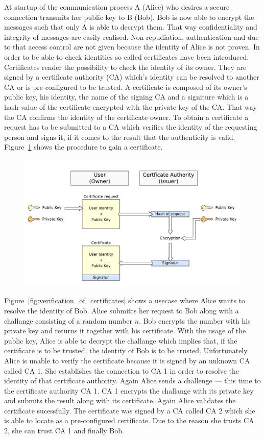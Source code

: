 At startup of the communication process A (Alice) who desires a secure connection transmits her public key to B (Bob).
Bob is now able to encrypt the messages such that only A is able to decrypt them.
That way confidentiality and integrity of messages are easily realised.
Non-repudiation, authentication and due to that access control are not given because the identity of Alice is not proven.
In order to be able to check identities so called certificates have been introduced.
Certificates render the possibility to check the identity of its owner. They are signed by a certificate authority (CA) which's identity can be resolved to another CA or is  pre-configured to be trusted.
A certificate is composed of its owner's public key, his identity, the name of the signing CA and a signiture which is a hash-value of the certificate encrypted with the private key of the CA. 
That way the CA confirms the identity of the certificate owner. 
To obtain a certificate a request has to be submitted to a CA which verifies the identity of the requesting person and signs it, if it comes to the result that the authenticity is valid. Figure~\ref{fig:certificate_request} shows the procedure to gain a certificate.
\begin{figure}[htb]
	\centering%
 	\includegraphics[width=13cm]{tex_tls_echoservice/certificates.pdf}
	\label{fig:certificate_request}
\end{figure}
Figure~\ref{fig:verification_of_certificates} shows a usecase where Alice wants to resolve the identity of Bob. Alice submitts her request to Bob along with a challange consisting of a random number $n$. Bob encrypts the number with his private key and returns it together with his certificate. With the usage of the public key, Alice is able to decrypt the challange which implies that, if the certificate is to be trusted, the identity of Bob is to be trusted. Unfortunately Alice is unable to verify the certificate because it is signed by an unknown CA called CA 1. She establishes the connection to CA 1 in order to resolve the identity of that certificate authority. Again Alice sends a challenge --- this time to the certificate authority CA 1. CA 1 encrypts the challange with its private key and submits the result along with its certificate. Again Alice validates the certificate sucessfully. 
The certificate was signed by a CA called CA 2 which she is able to locate as a pre-configured certificate. Due to the reason she trusts CA 2, she can trust CA 1 and finally Bob. 


